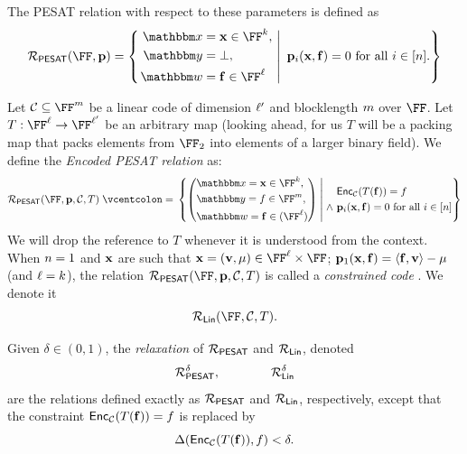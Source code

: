 \documentclass[11pt,letterpaper,usenames,dvipsnames]{article}
\begin{document}
\begin{definition}\label{d:pesat} The PESAT relation with respect to these parameters is defined as
$$
\PESAT(\FF,\pp) = \left\{\left. 
\begin{aligned}
    \inp &= \xx \in \FF^{\inplen},\\
    \oracle &= \bot ,\\
    \wit &=\bff \in \FF^\codedim
\end{aligned} 
\ \right| \ 
\begin{aligned}
    \mathbf{p}_{i}(\xx, \bff) = 0  \text{ for all } i\in [\numrows].
\end{aligned}
\right\}
$$
\end{definition}
%
Let $\cC\subseteq \FF^{\codelength}$ be a linear code of dimension $\ell'$ and blocklength $m$ over $\FF$.    Let $T:\FF^{\codedim} \to \FF^{\codedim'}$ be an arbitrary map (looking ahead, for us $T$ will be a packing map that packs elements from $\FF_2$ into elements of a larger binary field).  We define the \emph{Encoded PESAT  relation} as: %
%
$$
\PESAT(\FF, \pp, \cC, T) \defeq \left\{ \left(\begin{aligned} &\inp=\xx\in \FF^\inplen, \\&\oracle = f \in \FF^{\codelength}, \\ &\wit= \bff\in (\FF^\codedim)\end{aligned}\right) \;\middle|\;  \begin{aligned} 
&\Enc_{\cC}(T(\bff)) = f\\ \wedge \  &\pp_i(\xx, \bff) = 0  \text{ for all } i\in [\numrows]\end{aligned}\right\}
$$
We will drop the reference to $T$ whenever it is understood from the context. When $n=1$ and $\mathbf{x}$ are such that $\xx=(\vv,\mu)\in \FF^{\codedim}\times \FF$; $\mathbf{p}_1(\mathbf{x},\mathbf{f})= \langle \mathbf{f}, \mathbf{v}\rangle -\mu$ (and $\ell=k$), the relation $\PESAT(\FF,\pp, \cC, T)$ is called a \emph{constrained code} \cite{WHIR?} .  We denote it $$\LIN(\FF,\cC,T).$$
%
\begin{definition}Given $\delta \in (0,1)$, the \emph{relaxation} of $\mathcal{R}_{\mathsf{PESAT}}$ and $\mathcal{R}_{\mathsf{Lin}}$, denoted
%
$$
\mathcal{R}_{\mathsf{PESAT}}^\delta, \qquad \qquad \mathcal{R}_{\mathsf{Lin}}^{\delta}
$$
%
are the relations defined exactly as $\mathcal{R}_{\mathsf{PESAT}}$ and $\mathcal{R}_{\mathsf{Lin}}$, respectively, except that the constraint $\mathsf{Enc}_{\mathcal{C}}(T(\mathbf{f}))=f$ is replaced by
%
$$
\Delta(\mathsf{Enc}_{\mathcal{C}}(T(\mathbf{f})), f) < \delta.
$$
\end{definition}
\end{document}
